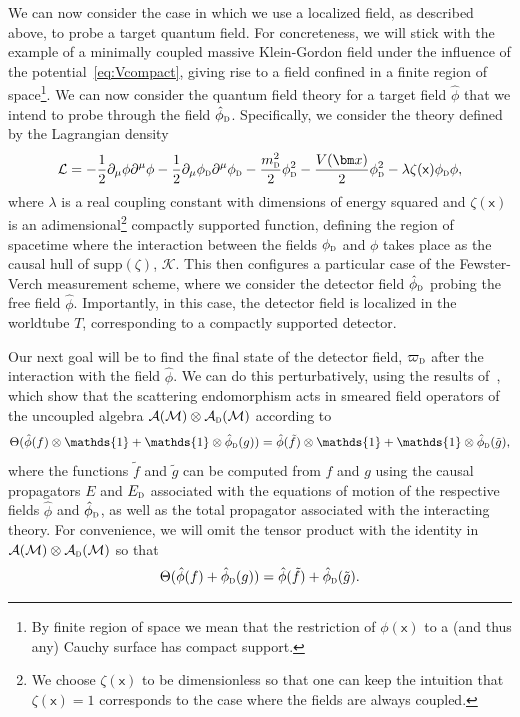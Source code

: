 \documentclass[letterpaper,12pt,titlepage,oneside,final]{book}
\newcommand{\openone}{\mathds{1}}
\newcommand{\M}{\mathcal{M}}
\newcommand{\mf}{\mathsf}%
\newcommand{\tc}[1]{\textsc{#1}}
\begin{document}
We can now consider the case in which we use a localized field, as described above, to probe a target quantum field. For concreteness, we will stick with the example of a minimally coupled massive Klein-Gordon field under the influence of the potential~\eqref{eq:Vcompact}, giving rise to a field confined in a finite region of space\footnote{By finite region of space we mean that the restriction of $\phi(\mf x)$ to a (and thus any) Cauchy surface has compact support.}. We can now consider the quantum field theory for a target field $\hat{\phi}$ that we intend to probe through the field $\hat{\phi}_\tc{d}$. Specifically, we consider the theory defined by the Lagrangian density
\begin{equation}
    \mathcal{L} = - \frac{1}{2}\partial_\mu \phi \partial^\mu \phi - \frac{1}{2}\partial_\mu \phi_\tc{d} \partial^\mu \phi_\tc{d} - \frac{m_\tc{d}^2}{2}\phi_\tc{d}^2 - \frac{V(\bm x)}{2}\phi_\tc{d}^2 - \lambda \zeta(\mf x) \phi_\tc{d}\phi,
\end{equation}
where $\lambda$ is a real coupling constant with dimensions of energy squared and $\zeta(\mf x)$ is an adimensional\footnote{We choose $\zeta(\mf x)$ to be dimensionless so that one can keep the intuition that $\zeta(\mf x) = 1$ corresponds to the case where the fields are always coupled.} compactly supported function, defining the region of spacetime where the interaction between the fields $\phi_\tc{d}$ and $\phi$ takes place as the causal hull of $\text{supp}(\zeta)$, $\mathcal{K}$. This then configures a particular case of the Fewster-Verch measurement scheme, where we consider the detector field $\hat{\phi}_\tc{d}$ probing the free field $\hat{\phi}$. Importantly, in this case, the detector field is localized in the worldtube $T$, corresponding to a compactly supported detector.

Our next goal will be to find the final state of the detector field, $\varpi_\tc{d}$ after the interaction with the field $\hat{\phi}$. We can do this perturbatively, using the results of~\cite{FVOG}, which show that the scattering endomorphism acts in smeared field operators of the uncoupled algebra $\mathcal{A}(\M)\otimes \mathcal{A}_\tc{d}(\M)$ according to
\begin{equation}
    \Theta(\hat{\phi}(f)\otimes \openone + \openone \otimes \hat{\phi}_\tc{d}(g)) = \hat{\phi}(\tilde{f})\otimes \openone + \openone \otimes \hat{\phi}_\tc{d}(\tilde{g}),
\end{equation}
where the functions $\tilde{f}$ and $\tilde{g}$ can be computed from $f$ and $g$ using the causal propagators $E$ and $E_\tc{d}$ associated with the equations of motion of the respective fields $\hat{\phi}$ and $\hat{\phi}_\tc{d}$, as well as the total propagator associated with the interacting theory. For convenience, we will omit the tensor product with the identity in $\mathcal{A}(\M)\otimes \mathcal{A}_\tc{d}(\M)$ so that
\begin{equation}
    \Theta(\hat{\phi}(f) +  \hat{\phi}_\tc{d}(g)) = \hat{\phi}(\tilde{f}) +  \hat{\phi}_\tc{d}(\tilde{g}).
\end{equation}
\end{document}

